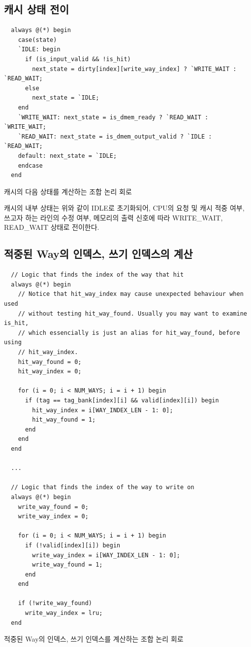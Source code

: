 \documentclass[openright, a4paper]{article}
\newenvironment{longlisting}{\captionsetup{type=listing}}{}
\begin{document}
\subsection{캐시 상태 전이}

\hfill

\begin{longlisting}
    \begin{verbatim}
  always @(*) begin
    case(state)
    `IDLE: begin
      if (is_input_valid && !is_hit)
        next_state = dirty[index][write_way_index] ? `WRITE_WAIT : `READ_WAIT;
      else
        next_state = `IDLE;
    end
    `WRITE_WAIT: next_state = is_dmem_ready ? `READ_WAIT : `WRITE_WAIT;
    `READ_WAIT: next_state = is_dmem_output_valid ? `IDLE : `READ_WAIT;
    default: next_state = `IDLE;
    endcase
  end
    \end{verbatim}
    \caption{캐시의 다음 상태를 계산하는 조합 논리 회로}
\end{longlisting}

\hfill

캐시의 내부 상태는 위와 같이 IDLE로 초기화되어, CPU의 요청 및 캐시 적중 
여부, 쓰고자 하는 라인의 수정 여부, 메모리의 출력 신호에 따라 WRITE_WAIT,
READ_WAIT 상태로 전이한다.  

\subsection{적중된 Way의 인덱스, 쓰기 인덱스의 계산}

\hfill

\begin{longlisting}
    \begin{verbatim}
  // Logic that finds the index of the way that hit
  always @(*) begin
    // Notice that hit_way_index may cause unexpected behaviour when used
    // without testing hit_way_found. Usually you may want to examine is_hit,
    // which essencially is just an alias for hit_way_found, before using
    // hit_way_index.
    hit_way_found = 0;
    hit_way_index = 0;

    for (i = 0; i < NUM_WAYS; i = i + 1) begin
      if (tag == tag_bank[index][i] && valid[index][i]) begin
        hit_way_index = i[WAY_INDEX_LEN - 1: 0]; 
        hit_way_found = 1;
      end   
    end
  end
  
  ...

  // Logic that finds the index of the way to write on
  always @(*) begin
    write_way_found = 0;
    write_way_index = 0;

    for (i = 0; i < NUM_WAYS; i = i + 1) begin
      if (!valid[index][i]) begin
        write_way_index = i[WAY_INDEX_LEN - 1: 0];
        write_way_found = 1;
      end
    end

    if (!write_way_found)
      write_way_index = lru;
  end
    \end{verbatim}
    \caption{적중된 Way의 인덱스, 쓰기 인덱스를 계산하는 조합 논리 회로}
\end{longlisting}
\end{document}
